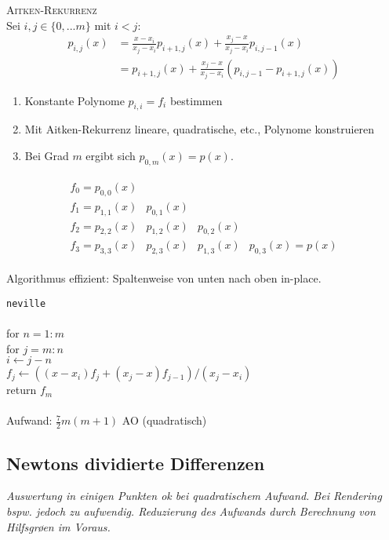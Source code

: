 \textsc{Aitken-Rekurrenz}\\
Sei $i,j \in \{0,...m\}$ mit $i < j$:
\begin{align*}
p_{i,j}(x) &= \frac{x-x_i}{x_j-x_i} p_{i+1,j}(x) + \frac{x_j-x}{x_j-x_i}p_{i,j-1}(x) \\
&= p_{i+1,j}(x) + \frac{x_j-x}{x_j-x_i} (p_{i,j-1} - p_{i+1,j}(x))
\end{align*}
\begin{enumerate}
\item Konstante Polynome $p_{i,i} = f_i$ bestimmen
\item Mit Aitken-Rekurrenz lineare, quadratische, etc., Polynome konstruieren
\item Bei Grad $m$ ergibt sich $p_{0,m}(x) = p(x)$.
\end{enumerate}

\begin{align*}
\begin{array}{cccc}
f_0 = p_{0,0}(x) &             &            &  \\
f_1 = p_{1,1}(x) &  p_{0,1}(x) &            &  \\
f_2 = p_{2,2}(x) &  p_{1,2}(x) & p_{0,2}(x) &  \\
f_3 = p_{3,3}(x) &  p_{2,3}(x) & p_{1,3}(x) &  p_{0,3}(x) = p(x)
\end{array}
\end{align*}

Algorithmus effizient: Spaltenweise von unten nach oben in-place.

\verb!neville!\\
{\addtolength{\leftskip}{0mm}
\hrulefill\\
for $n=1:m$  \\
\quad for $j=m:n$  \\
\qquad $i \leftarrow j-n$  \\
\qquad $f_j \leftarrow ((x-x_i)f_j + (x_j-x)f_{j-1})/(x_j-x_i)$\\
return $f_m$ \\
\hrulefill\\
}
Aufwand: $\frac{7}{2}m (m+1)$ AO (quadratisch)

\subsection{Newtons dividierte Differenzen}
\emph{Auswertung in einigen Punkten ok bei quadratischem Aufwand. Bei Rendering bspw. jedoch zu aufwendig. Reduzierung des Aufwands durch Berechnung von Hilfsgr\o \s en im Voraus.}\\

